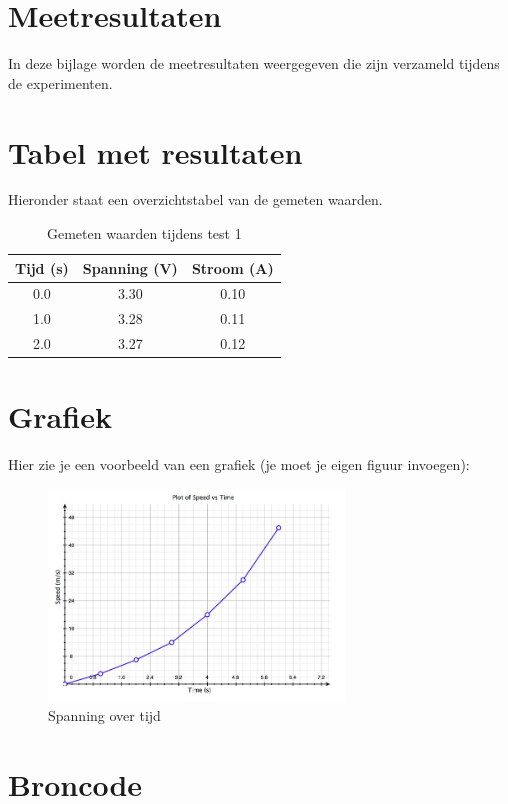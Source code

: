 \appendix
\section{Meetresultaten}
\label{appendix:meetresultaten}

In deze bijlage worden de meetresultaten weergegeven die zijn verzameld tijdens de experimenten.

\section{Tabel met resultaten}
Hieronder staat een overzichtstabel van de gemeten waarden.

\begin{table}[h!]
\centering
\begin{tabular}{|c|c|c|}
\hline
Tijd (s) & Spanning (V) & Stroom (A) \\
\hline
0.0 & 3.30 & 0.10 \\
1.0 & 3.28 & 0.11 \\
2.0 & 3.27 & 0.12 \\
\hline
\end{tabular}
\caption{Gemeten waarden tijdens test 1}
\end{table}

\section{Grafiek}
Hier zie je een voorbeeld van een grafiek (je moet je eigen figuur invoegen):

\begin{figure}[h!]
\centering
\includegraphics[width=0.7\textwidth]{./afbeeldingen/grafiek.jpeg}
\caption{Spanning over tijd}
\label{fig:spanning_tijd}
\end{figure}

\section{Broncode}
\label{appendix:broncode}

